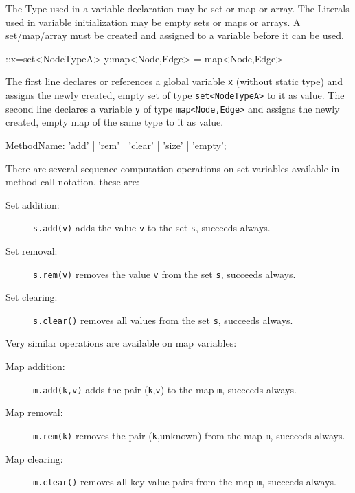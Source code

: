 The Type used in a variable declaration may be set or map or array.
The Literals used in variable initialization may be empty sets or maps or arrays.
A set/map/array must be created and assigned to a variable before it can be used.

\begin{example}
\begin{grgen}
::x=set<NodeTypeA>{}
y:map<Node,Edge> = map<Node,Edge>{}
\end{grgen}
The first line declares or references a global variable \texttt{x} (without static type) and assigns the newly created, empty set of type \texttt{set<NodeTypeA>} to it as value.
The second line declares a variable \texttt{y} of type \texttt{map<Node,Edge>} and assigns the newly created, empty map of the same type to it as value.
\end{example}

\begin{rail}
  MethodName: 'add' | 'rem' | 'clear' | 'size' | 'empty';
\end{rail}

\noindent There are several sequence computation operations on set variables available in method call notation, these are:

\begin{description}
\item[Set addition:] \texttt{s.add(v)} adds the value \texttt{v} to the set \texttt{s}, succeeds always.
\item[Set removal:] \texttt{s.rem(v)} removes the value \texttt{v} from the set \texttt{s}, succeeds always.
\item[Set clearing:] \texttt{s.clear()} removes all values from the set \texttt{s}, succeeds always.
\end{description}

\noindent Very similar operations are available on map variables:

\begin{description}
\item[Map addition:] \texttt{m.add(k,v)} adds the pair (\texttt{k},\texttt{v}) to the map \texttt{m}, succeeds always.
\item[Map removal:] \texttt{m.rem(k)} removes the pair (\texttt{k},unknown) from the map \texttt{m}, succeeds always.
\item[Map clearing:] \texttt{m.clear()} removes all key-value-pairs from the map \texttt{m}, succeeds always.
\end{description}

